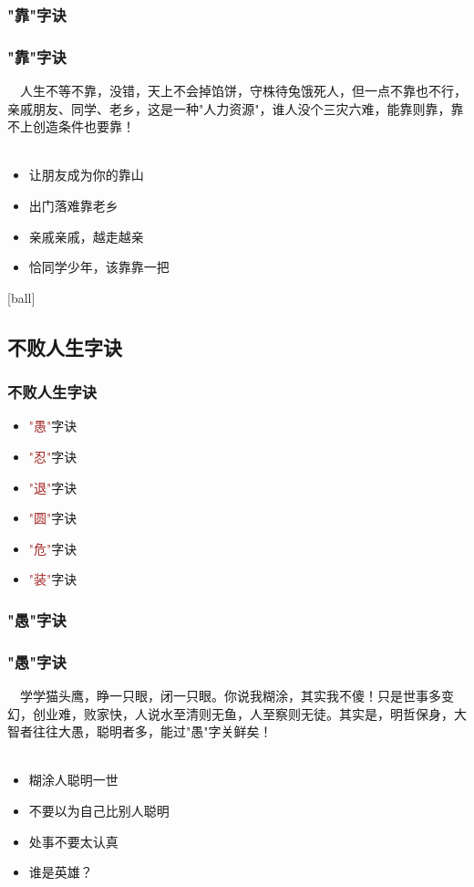 \subsubsection{"靠"字诀}
\begin{frame}
\frametitle{"靠"字诀}
\noindent\handr~~人生不等不靠，没错，天上不会掉馅饼，守株待兔饿死人，但一点不靠也不行，亲戚朋友、同学、老乡，这是一种"人力资源"，谁人没个三灾六难，能靠则靠，靠不上创造条件也要靠！
~\\
~\\
\begin{itemize}
    \item 让朋友成为你的靠山
    \item 出门落难靠老乡
    \item 亲戚亲戚，越走越亲
    \item 恰同学少年，该靠靠一把
\end{itemize}
\end{frame}

[ball]

\subsection{不败人生字诀}
\begin{frame}
\frametitle{不败人生字诀}
\begin{itemize}
    \item \textcolor{brown}{"愚"}字诀
    \item \textcolor{brown}{"忍"}字诀
    \item \textcolor{brown}{"退"}字诀
    \item \textcolor{brown}{"圆"}字诀
    \item \textcolor{brown}{"危"}字诀
    \item \textcolor{brown}{"装"}字诀
\end{itemize}
\end{frame}


\subsubsection{"愚"字诀}
\begin{frame}
\frametitle{"愚"字诀}
\noindent\handr~~学学猫头鹰，睁一只眼，闭一只眼。你说我糊涂，其实我不傻！只是世事多变幻，创业难，败家快，人说水至清则无鱼，人至察则无徒。其实是，明哲保身，大智者往往大愚，聪明者多，能过"愚"字关鲜矣！
~\\
~\\
\begin{itemize}
    \item 糊涂人聪明一世
    \item 不要以为自己比别人聪明
    \item 处事不要太认真
    \item 谁是英雄？
\end{itemize}
\end{frame}

